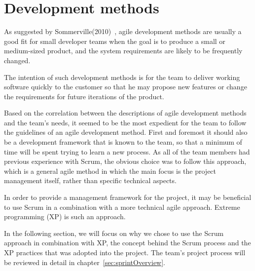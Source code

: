 \section{Development methods}

As suggested by Sommerville(2010)~\cite{scrum}, agile development methods are usually a good fit for small developer teams when the goal is to produce a small or medium-sized product, and the system requirements are likely to be frequently changed.

The intention of such development methods is for the team to deliver working software quickly to the customer so that he may propose new features or change the requirements for future iterations of the product.

Based on the correlation between the descriptions of agile development methods and the team's needs, it seemed to be the most expedient for the team to follow the guidelines of an agile development method. First and foremost it should also be a development framework that is known to the team, so that a minimum of time will be spent trying to learn a new process. As all of the team members had previous experience with Scrum, the obvious choice was to follow this approach, which is a general agile method in which the main focus is the project management itself, rather than specific technical aspects.

In order to provide a management framework for the project, it may be beneficial to use Scrum in a combination with a more technical agile approach. Extreme programming (XP) is such an approach.

In the following section, we will focus on why we chose to use the Scrum approach in combination with XP, the concept behind the Scrum process and the XP practices that was adopted into the project. The team's project process will be reviewed in detail in chapter~\ref{sec:sprintOverview}.